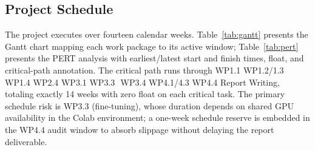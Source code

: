 \documentclass[conference]{IEEEtran}
\begin{document}
\subsection{Project Schedule}
The project executes over fourteen calendar weeks. Table~\ref{tab:gantt} presents the Gantt chart mapping each work package to its active window; Table~\ref{tab:pert} presents the PERT analysis with earliest/latest start and finish times, float, and critical-path annotation. The critical path runs through WP1.1\,\textrightarrow\,WP1.2/1.3\,\textrightarrow\,WP1.4\,\textrightarrow\,WP2.4\,\textrightarrow\,WP3.1\,\textrightarrow\,WP3.3\, \textrightarrow\,WP3.4\,\textrightarrow\,WP4.1/4.3\,\textrightarrow\,WP4.4\,\textrightarrow\,Report Writing, totaling exactly 14 weeks with zero float on each critical task. The primary schedule risk is WP3.3 (fine-tuning), whose duration depends on shared GPU availability in the Colab environment; a one-week schedule reserve is embedded in the WP4.4 audit window to absorb slippage without delaying the report deliverable.

\newcommand{\act}{\cellcolor{activeBar}}
\end{document}
